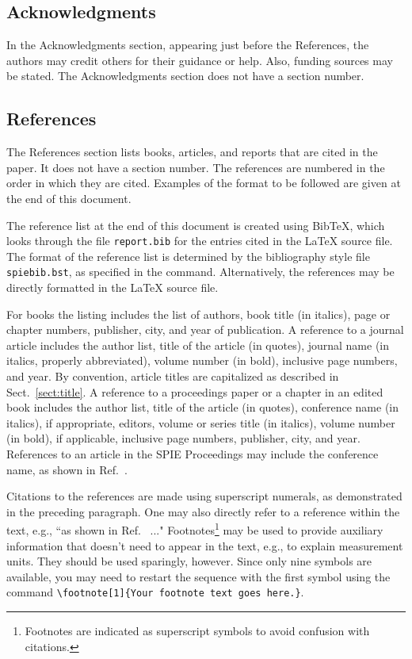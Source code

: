 \documentclass[]{spie}  %
\begin{document}
\subsection{Acknowledgments} 
In the Acknowledgments section, appearing just before the References, the authors may credit others for their guidance or help.  Also, funding sources may be stated.  The Acknowledgments section does not have a section number.

\subsection{References} 
The References section lists books, articles, and reports that are cited in the paper.  It does not have a section number.  The references are numbered in the order in which they are cited.  Examples of the format to be followed are given at the end of this document.  

The reference list at the end of this document is created using BibTeX, which looks through the file {\tt report.bib} for the entries cited in the LaTeX source file.  The format of the reference list is determined by the bibliography style file {\tt spiebib.bst}, as specified in the \verb|| command.  Alternatively, the references may be directly formatted in the LaTeX source file.

For books\cite{Lamport94,Eisenberg92,Gelman95,Goossens97} the listing includes the list of authors, book title (in italics), page or chapter numbers, publisher, city, and year of publication.  A reference to a journal article\cite{Metropolis53} includes the author list, title of the article (in quotes), journal name (in italics, properly abbreviated), volume number (in bold), inclusive page numbers, and year.  By convention\cite{Lamport94}, article titles are capitalized as described in Sect.~\ref{sect:title}.  A reference to a proceedings paper or a chapter in an edited book\cite{Gull89a} includes the author list, title of the article (in quotes), conference name (in italics), if appropriate, editors, volume or series title (in italics), volume number (in bold), if applicable, inclusive page numbers, publisher, city, and year.  References to an article in the SPIE Proceedings may include the conference name, as shown in Ref.~.

Citations to the references are made using superscript numerals, as demonstrated in the preceding paragraph.  One may also directly refer to a reference within the text, e.g., ``as shown in Ref.~ ..." Footnotes\footnote{Footnotes are indicated as superscript symbols to avoid confusion with citations.} may be used to provide auxiliary information that doesn't need to appear in the text, e.g., to explain measurement units.  They should be used sparingly, however.  Since only nine symbols are available, you may need to restart the sequence with the first symbol using the command  \verb|\footnote[1]{Your footnote text goes here.}|.
\end{document}
